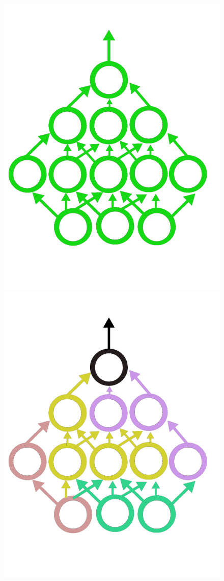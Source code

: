 \begin{figure}[!htb]
  \includegraphics[width=\linewidth]{./Images/Chapter04/fine_tuning_net.pdf}
\endminipage\hfill
{}%
  \includegraphics[width=\linewidth]{./Images/Chapter04/random_net.pdf}

\end{figure}
